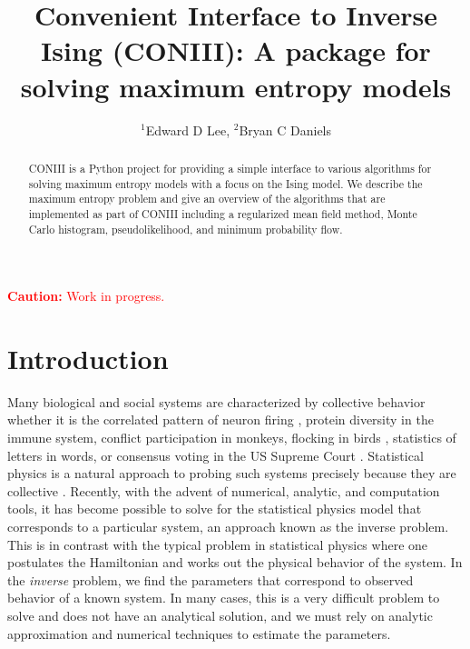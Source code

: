 \documentclass[aps,prl,twocolumn]{revtex4-1}
\begin{document}
\newcommand{\mr}[1]{\mathrm{#1}}
\newcommand{\mb}[1]{\mathbf{#1}}
\newcommand{\br}[1]{\left<#1\right>}
\newcommand{\bl}[1]{\left|#1\right|}
\newcommand{\mc}[1]{\mathcal{#1}}
\newcommand{\tb}[1]{\textcolor{blue}{#1}}
\newcommand{\tr}[1]{\textcolor{red}{#1}}
\newcommand{\tg}[1]{\textcolor{green}{#1}}
\newcommand{\si}[0]{\sigma_{\rm i}}
\newcommand{\sj}[0]{\sigma_{\rm j}}
\newcommand{\bs}[1]{\boldsymbol{#1}}

\title{Convenient Interface to Inverse Ising (CONIII): A package for solving maximum entropy models}
\author{$^1$Edward D Lee, $^2$Bryan C Daniels}

\begin{abstract}
CONIII is a Python project for providing a simple interface to various algorithms for solving maximum entropy models with a focus on the Ising model. We describe the maximum entropy problem and give an overview of the algorithms that are implemented as part of CONIII including a regularized mean field method, Monte Carlo histogram, pseudolikelihood, and minimum probability flow. 
\end{abstract}

\maketitle

\tr{{\bf Caution:} Work in progress.}

\section{Introduction}
Many biological and social systems are characterized by collective behavior whether it is the correlated pattern of neuron firing \cite{Schneidman:2006he}, protein diversity in the immune system, conflict participation in monkeys, flocking in birds \cite{Bialek:2012cs}, statistics of letters in words, or consensus voting in the US Supreme Court \cite{Lee:2015ev}. Statistical physics is a natural approach to probing such systems precisely because they are collective \cite{Castellano:2009ce}.
Recently, with the advent of numerical, analytic, and computation tools, it has become possible to solve for the statistical physics model that corresponds to a particular system, an approach known as the inverse problem.
This is in contrast with the typical problem in statistical physics where one postulates the Hamiltonian and works out the physical behavior of the system. In the \textit{inverse} problem, we  find the parameters that correspond to observed behavior of a known system. In many cases, this is a very difficult problem to solve and does not have an analytical solution, and we must rely on analytic approximation and numerical techniques to estimate the parameters.
\end{document}
